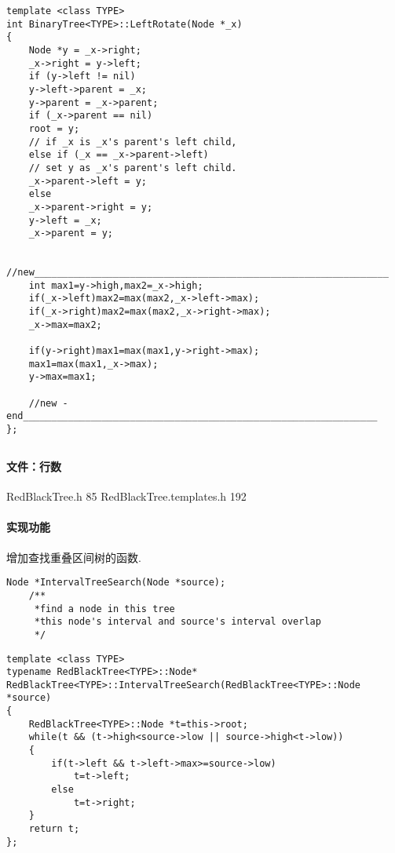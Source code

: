 \documentclass{article}
\begin{document}
\begin{lstlisting}
template <class TYPE>
int BinaryTree<TYPE>::LeftRotate(Node *_x)
{
    Node *y = _x->right;
    _x->right = y->left;
    if (y->left != nil)
	y->left->parent = _x;
    y->parent = _x->parent;
    if (_x->parent == nil)
	root = y;
    // if _x is _x's parent's left child,
    else if (_x == _x->parent->left)
	// set y as _x's parent's left child.
	_x->parent->left = y;
    else
	_x->parent->right = y;
    y->left = _x;
    _x->parent = y;
    
    //new_______________________________________________________________
    int max1=y->high,max2=_x->high;
    if(_x->left)max2=max(max2,_x->left->max);
    if(_x->right)max2=max(max2,_x->right->max);
    _x->max=max2;
    
    if(y->right)max1=max(max1,y->right->max);
    max1=max(max1,_x->max);
    y->max=max1;
    
    //new -end_______________________________________________________________
};
\end{lstlisting}

\subsection{}
\paragraph{文件：行数}
RedBlackTree.h		85      RedBlackTree.templates.h    192
\paragraph{实现功能}
增加查找重叠区间树的函数.
\begin{lstlisting}
Node *IntervalTreeSearch(Node *source);
    /**
     *find a node in this tree
     *this node's interval and source's interval overlap
     */
\end{lstlisting}

\begin{lstlisting}
template <class TYPE>
typename RedBlackTree<TYPE>::Node* RedBlackTree<TYPE>::IntervalTreeSearch(RedBlackTree<TYPE>::Node *source)
{
    RedBlackTree<TYPE>::Node *t=this->root;
    while(t && (t->high<source->low || source->high<t->low))
    {
        if(t->left && t->left->max>=source->low)
            t=t->left;
        else
            t=t->right;
    }
    return t;
};
\end{lstlisting}
\end{document}
